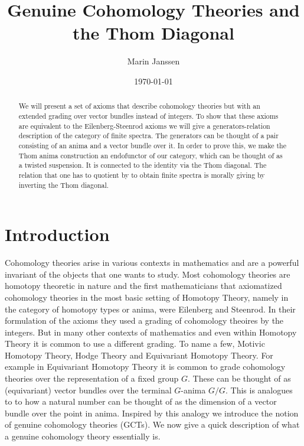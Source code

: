 \documentclass{article}
\begin{document}
\title{Genuine Cohomology Theories and the Thom Diagonal}
\author{Marin Janssen}
\date{\today}

\maketitle

\begin{abstract}
    We will present a set of axioms that describe cohomology theories but with an extended grading over vector bundles instead of integers.
    To show that these axioms are equivalent to the Eilenberg-Steenrod axioms we will give a generators-relation description of the category of finite spectra.
    The generators can be thought of a pair consisting of an anima and a vector bundle over it.
    In order to prove this, we make the Thom anima construction an endofunctor of our category, which can be thought of as a twisted suspension.
    It is connected to the identity via the Thom diagonal. The relation that one has to quotient by to obtain finite spectra is morally giving 
    by inverting the Thom diagonal.
\end{abstract}

\tableofcontents

\section{Introduction}
Cohomology theories arise in various contexts in mathematics and are a powerful invariant of the objects that one wants to study.
Most cohomology theories are homotopy theoretic in nature and the first mathematicians that axiomatized cohomology theories in the most
basic setting of Homotopy Theory, namely in the category of homotopy types or anima, were Eilenberg and Steenrod.
In their formulation of the axioms they used a grading of cohomology theoires by the integers.
But in many other contexts of mathematics and even within Homotopy Theory it is common to use a different grading.
To name a few, Motivic Homotopy Theory, Hodge Theory and Equivariant Homotopy Theory. 
For example in Equivariant Homotopy Theory it is common to 
grade cohomology theories over the representation of a fixed group $G$.
These can be thought of as (equivariant) vector bundles over the 
terminal $G$-anima $G/G$.
This is analogues to to how a natural number can be thought of as the dimension of a vector bundle over the point in anima.
Inspired by this analogy we introduce the notion of genuine cohomology theories (GCTs).
We now give a quick description of what a genuine cohomology theory essentially is.
\end{document}
